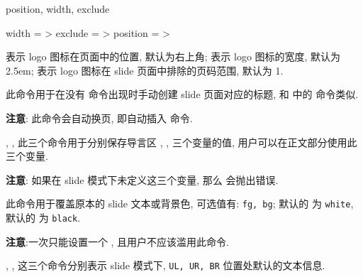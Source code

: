 \begin{keyval}[parent=ztex/slide/logo]{position, width, exclude}
  \begin{syntax}
    width    = >\dval{2.5em}
    exclude  = >
    position = >
  \end{syntax}
   表示 logo 图标在页面中的位置, 默认为右上角;  表示 logo 图标的宽度, 默认为 2.5em;
   表示 logo 图标在 slide 页面中排除的页码范围, 默认为 1.
\end{keyval}


\begin{function}[added=2025-05-09]{\zslideframetitle}
  \begin{syntax}
  \end{syntax}
  此命令用于在没有  命令出现时手动创建 slide 页面对应的标题, 和  中的  命令类似. \par
  \textbf{注意}: 此命令会自动换页, 即自动插入  命令.
\end{function}


\begin{function}[updated=2025-04-25]{\zslidetitle, \zslideauthor, \zslidedate}
  此三个命令用于分别保存导言区 \cmd{\@title}, \cmd{\@author}, \cmd{\@date} 三个变量的值, 
  用户可以在正文部分使用此三个变量.\par \textbf{注意}: 如果在 slide 模式下未定义这三个变量, 那么
  \zTeX{} 会抛出错误.
\end{function}


\begin{function}[updated=2025-04-25]{\zslidedocolor}
  \begin{syntax}
  \end{syntax}
  此命令用于覆盖原本的 slide 文本或背景色,  可选值有: \texttt{fg, bg}; 
   默认的  为 \texttt{white},  默认的  为 \texttt{black}. \par
  \textbf{注意}:一次只能设置一个 , 且用户不应该滥用此命令.
\end{function}


\begin{function}[updated=2025-04-25]{\zslideUL, \zslideUR, \zslideBR}
  这三个命令分别表示 slide 模式下, \texttt{UL, UR, BR} 位置处默认的文本信息.
\end{function}


